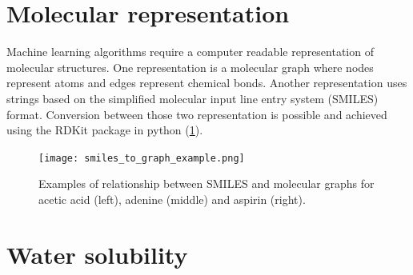 % 
% 



\section{Molecular representation}


Machine learning algorithms require a computer readable representation of molecular structures. 
One representation is a molecular graph where nodes represent atoms and edges 
represent chemical bonds. Another representation uses strings based on the simplified 
molecular input line entry system (SMILES) 
format.\cite{weininger1988smiles} Conversion between those two representation is 
possible and achieved using the RDKit package in python (\cref{fig:smiles_and_graphs}).
\cite{landrum2010r}


\begin{figure}[h]
    \centering
    \texttt{[image: smiles\_to\_graph\_example.png]}
    \caption{Examples of relationship between SMILES and molecular graphs for acetic acid (left),
    adenine (middle) and aspirin (right).}
    \label{fig:smiles_and_graphs}
\end{figure}


\section{Water solubility}


